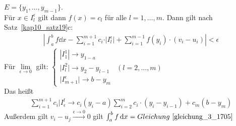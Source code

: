 \begin{Definition}
{	$E = \{y_1, \hdots, y_{m-1}\}$. \\
	Für $x \in I_l^{\epsilon}$ gilt dann $f(x) = c_l$ für alle $ l = 1, \hdots, m$.
	Dann gilt nach Satz~\ref{kap10_satz19}c:
	\begin{align*}
		\left\vert \int_a^b f \dd{x} - \sum_{i=1}^{m+1} c_i \cdot \vert 
		I_l^{\epsilon}\vert + \sum_{i =1}^{m-1} f(y_i)\cdot (v_i -u_i) \right\vert
		< \epsilon
	\end{align*}
	Für $ \lim\limits_{\epsilon \rightarrow 0}{}$ gilt:
	$\begin{cases} 
		|I_1^1| \rightarrow y_{1-a} & \\
		\vert I_l^2 \vert \rightarrow y_2 - y_{l-1} & ( l = 2,...,m) \\
		\vert I_{m+1}^{\epsilon} \vert \rightarrow b - y_m &
	\end{cases}$ \\
	Das heißt
	\begin{align}
		\label{gleichung_3_1705}
		\sum_{i=1}^{m+1}c_i\vert I_{\epsilon}^l \rightarrow c_i(y_i -a) 
		\sum_{i=2}^m c_i \cdot (y_i -y_{i-1}) + c_m(b-y_m)
	\end{align}
	Außerdem gilt $v_i-u_j \overset{\epsilon \rightarrow 0}{\rightarrow} 0$
	gilt $\int_a^b f\dd{x} = Gleichung~\ref{gleichung_3_1705}$
	
}\end{Definition}